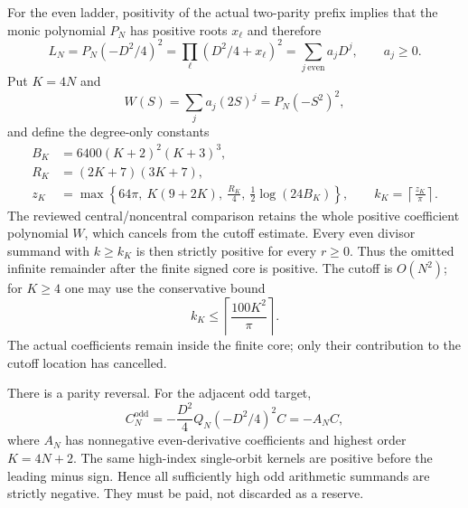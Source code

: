 \documentclass[11pt]{article}
\theoremstyle{definition}
\theoremstyle{remark}
\begin{document}
For the even ladder, positivity of the actual two-parity prefix implies that
the monic polynomial $P_N$ has positive roots $x_\ell$ and therefore
\begin{equation}
 L_N=P_N(-D^2/4)^2
     =\prod_\ell(D^2/4+x_\ell)^2
     =\sum_{j\ \mathrm{even}}a_jD^j,\qquad a_j\ge0.
 \label{eq:positive-operator-coefficients}
\end{equation}
Put $K=4N$ and
\begin{equation}
 W(S)=\sum_j a_j(2S)^j=P_N(-S^2)^2,
\end{equation}
and define the degree-only constants
\begin{align}
 B_K&=6400(K+2)^2(K+3)^3,\nonumber\\
 R_K&=(2K+7)(3K+7),\nonumber\\
 z_K&=\max\left\{64\pi,\ K(9+2K),\ \frac{R_K}{4},\
                \frac12\log(24B_K)\right\},
 \qquad
 k_K=\left\lceil\frac{z_K}{\pi}\right\rceil.
 \label{eq:degree-only-cutoff}
\end{align}
The reviewed central/noncentral comparison retains the whole positive
coefficient polynomial $W$, which cancels from the cutoff estimate. Every even
divisor summand with $k\ge k_K$ is then strictly positive for every $r\ge0$.
Thus the omitted infinite remainder after the finite signed core is positive.
The cutoff is $O(N^2)$; for $K\ge4$ one may use the conservative bound
\begin{equation}
 k_K\le\left\lceil\frac{100K^2}{\pi}\right\rceil.
\end{equation}
The actual coefficients remain inside the finite core; only their contribution
to the cutoff location has cancelled.

There is a parity reversal. For the adjacent odd target,
\begin{equation}
 C_N^{\mathrm{odd}}
 =-\frac{D^2}{4}Q_N(-D^2/4)^2C=-A_NC,
 \label{eq:odd-sign-reversal}
\end{equation}
where $A_N$ has nonnegative even-derivative coefficients and highest order
$K=4N+2$. The same high-index single-orbit kernels are positive before the
leading minus sign. Hence all sufficiently high odd arithmetic summands are
strictly negative. They must be paid, not discarded as a reserve.
\end{document}
